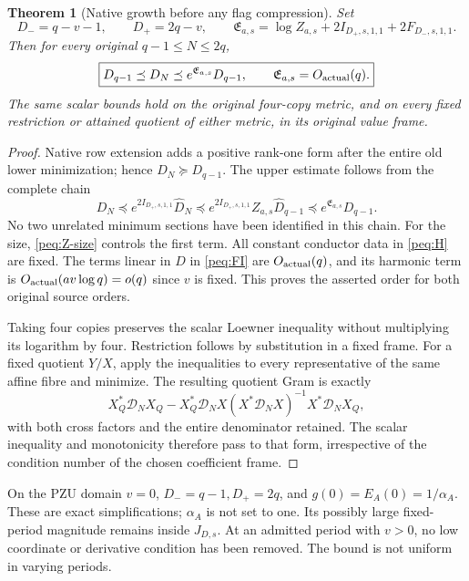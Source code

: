 \documentclass[11pt,a4paper]{article}
\newtheorem{theorem}{Theorem}
\begin{document}
\begin{theorem}[Native growth before any flag compression]
Set
\begin{equation}
 D_-=q-v-1,\qquad D_+=2q-v,\qquad
 \boxed{\mathfrak E_{a,s}
 =\log Z_{a,s}+2I_{D_+,s,1,1}+2F_{D_-,s,1,1}.}
 \label{peq:E}
\end{equation}
Then for every original $q-1\le N\le2q$,
\begin{equation}
 \boxed{D_{q-1}\preceq D_N\preceq
 e^{\mathfrak E_{a,s}}D_{q-1},\qquad
 \mathfrak E_{a,s}=O_{\rm actual}(q).}
 \label{peq:native-bound}
\end{equation}
The same scalar bounds hold on the original four-copy metric, and on every fixed restriction or attained quotient of either metric, in its original value frame.
\end{theorem}
\begin{proof}
Native row extension adds a positive rank-one form after the entire old lower minimization; hence $D_N\succeq D_{q-1}$. The upper estimate follows from the complete chain
\[
 D_N\preceq e^{2I_{D_+,s,1,1}}\widehat D_N
 \preceq e^{2I_{D_+,s,1,1}}Z_{a,s}\widehat D_{q-1}
 \preceq e^{\mathfrak E_{a,s}}D_{q-1}.
\]
No two unrelated minimum sections have been identified in this chain.
For the size, \eqref{peq:Z-size} controls the first term. All constant conductor data in \eqref{peq:H} are fixed. The terms linear in $D$ in \eqref{peq:FI} are $O_{\rm actual}(q)$, and its harmonic term is $O_{\rm actual}(av\log q)=o(q)$ since $v$ is fixed. This proves the asserted order for both original source orders.

Taking four copies preserves the scalar Loewner inequality without multiplying its logarithm by four. Restriction follows by substitution in a fixed frame. For a fixed quotient $Y/X$, apply the inequalities to every representative of the same affine fibre and minimize. The resulting quotient Gram is exactly
\[
 X_Q^*\mathcal D_NX_Q-X_Q^*\mathcal D_NX
            (X^*\mathcal D_NX)^{-1}X^*\mathcal D_NX_Q,
\]
with both cross factors and the entire denominator retained. The scalar inequality and monotonicity therefore pass to that form, irrespective of the condition number of the chosen coefficient frame.
\end{proof}

On the PZU domain $v=0$, $D_-=q-1,D_+=2q$, and $g(0)=E_A(0)=1/\alpha_A$. These are exact simplifications; $\alpha_A$ is not set to one. Its possibly large fixed-period magnitude remains inside $J_{D,s}$. At an admitted period with $v>0$, no low coordinate or derivative condition has been removed. The bound is not uniform in varying periods.
\end{document}
